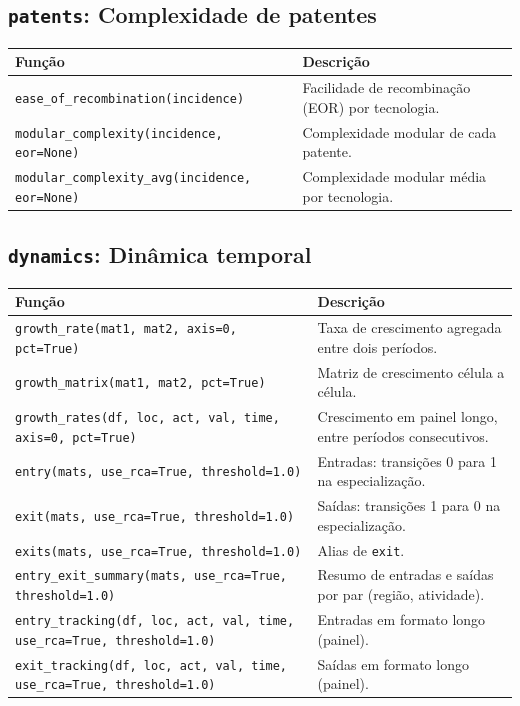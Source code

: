 \subsection{\texttt{patents}: Complexidade de patentes}
\begin{longtable}{>{\raggedright\arraybackslash}p{9.2cm} >{\raggedright\arraybackslash}p{7.0cm}}
\toprule
\textbf{Fun\c{c}\~{a}o} & \textbf{Descri\c{c}\~{a}o} \\
\midrule\endhead
\texttt{\footnotesize ease\_of\_recombination(incidence)} & {\small Facilidade de recombina\c{c}\~{a}o (EOR) por tecnologia.} \\[2pt]
\texttt{\footnotesize modular\_complexity(incidence, eor=None)} & {\small Complexidade modular de cada patente.} \\[2pt]
\texttt{\footnotesize modular\_complexity\_avg(incidence, eor=None)} & {\small Complexidade modular m\'{e}dia por tecnologia.} \\[2pt]
\bottomrule
\end{longtable}

\subsection{\texttt{dynamics}: Din\^{a}mica temporal}
\begin{longtable}{>{\raggedright\arraybackslash}p{9.2cm} >{\raggedright\arraybackslash}p{7.0cm}}
\toprule
\textbf{Fun\c{c}\~{a}o} & \textbf{Descri\c{c}\~{a}o} \\
\midrule\endhead
\texttt{\footnotesize growth\_rate(mat1, mat2, axis=0, pct=True)} & {\small Taxa de crescimento agregada entre dois per\'{i}odos.} \\[2pt]
\texttt{\footnotesize growth\_matrix(mat1, mat2, pct=True)} & {\small Matriz de crescimento c\'{e}lula a c\'{e}lula.} \\[2pt]
\texttt{\footnotesize growth\_rates(df, loc, act, val, time, axis=0, pct=True)} & {\small Crescimento em painel longo, entre per\'{i}odos consecutivos.} \\[2pt]
\texttt{\footnotesize entry(mats, use\_rca=True, threshold=1.0)} & {\small Entradas: transi\c{c}\~{o}es 0 para 1 na especializa\c{c}\~{a}o.} \\[2pt]
\texttt{\footnotesize exit(mats, use\_rca=True, threshold=1.0)} & {\small Sa\'{i}das: transi\c{c}\~{o}es 1 para 0 na especializa\c{c}\~{a}o.} \\[2pt]
\texttt{\footnotesize exits(mats, use\_rca=True, threshold=1.0)} & {\small Alias de \texttt{exit}.} \\[2pt]
\texttt{\footnotesize entry\_exit\_summary(mats, use\_rca=True, threshold=1.0)} & {\small Resumo de entradas e sa\'{i}das por par (regi\~{a}o, atividade).} \\[2pt]
\texttt{\footnotesize entry\_tracking(df, loc, act, val, time, use\_rca=True, threshold=1.0)} & {\small Entradas em formato longo (painel).} \\[2pt]
\texttt{\footnotesize exit\_tracking(df, loc, act, val, time, use\_rca=True, threshold=1.0)} & {\small Sa\'{i}das em formato longo (painel).} \\[2pt]
\bottomrule
\end{longtable}

